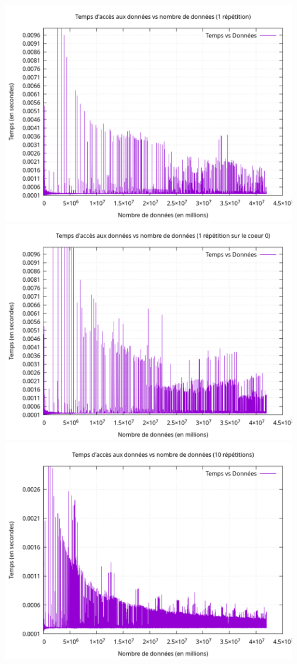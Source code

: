 \documentclass{rapport}
\begin{document}
    \includegraphics[width=13cm]{img/graphrep1.pdf} \\[1mm]
    \includegraphics[width=13cm]{img/graphrep1core.pdf} \\[1mm]
    \includegraphics[width=13cm]{img/graphrep10.pdf} \\[1mm]
\end{document}
